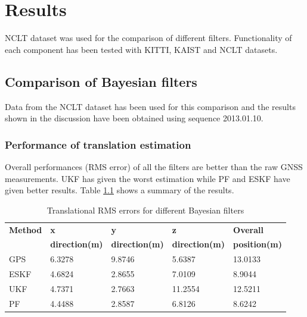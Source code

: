 \chapter{Results}
\label{chapter:results}
\gls{NCLT} dataset was used for the comparison of different filters. Functionality of each component has been tested with \gls{KITTI}, \gls{KAIST} and \gls{NCLT} datasets.




\section{Comparison of Bayesian filters}
\label{sec:BayesianFilterComparison}
Data from the \gls{NCLT} dataset has been used for this comparison and the results shown in the discussion have been obtained using sequence 2013.01.10.
\subsection{Performance of translation estimation}
Overall performances (\gls{RMS} error) of all the filters are better than the raw \gls{GNSS} measurements. \gls{UKF} has given the worst estimation while \gls{PF} and \gls{ESKF} have given better results. Table \ref{table:ch:RMSErrorPosition} shows a summary of the results.
\begin{table}[h]
    \centering
    \begin{tabular}{|p{2.5cm}|p{2.5cm}|p{2.5cm}|p{2.5cm}|p{2.5cm}|} 
        \hline
        \textbf{Method} & \textbf{x} & \textbf{y} & \textbf{z}& \textbf{Overall} \\
        \textbf{} & \textbf{direction(m)} & \textbf{direction(m)} & \textbf{direction(m)}& \textbf{position(m)} \\
        \hline
        GPS&6.3278 &9.8746 &5.6387& 13.0133\\
        \hline
        ESKF &4.6824& 2.8655 &7.0109 &8.9044\\
        \hline
        UKF &4.7371& 2.7663 &11.2554 &12.5211
        \\
        \hline
        PF& 4.4488& 2.8587& 6.8126& 8.6242
        \\
        \hline
    \end{tabular}
\caption{Translational \gls{RMS} errors for different Bayesian filters}
\label{table:ch:RMSErrorPosition}
\end{table}

